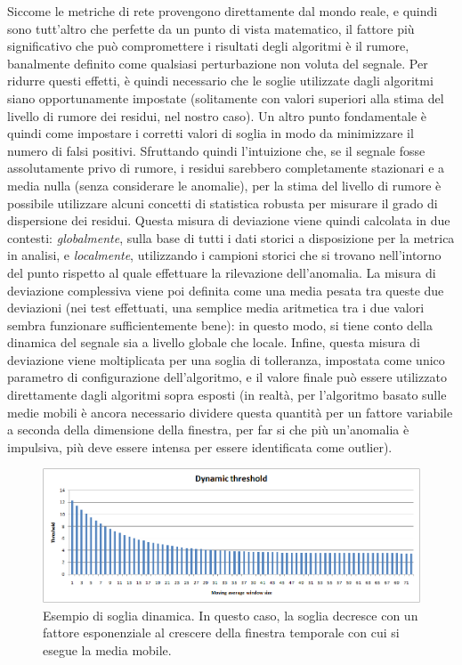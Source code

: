 \documentclass[12pt,a4paper,cucitura]{toptesi}
\begin{document}
Siccome le metriche di rete provengono direttamente dal mondo reale, e quindi sono tutt'altro che perfette da un punto di vista matematico, il fattore più significativo che può compromettere i risultati degli algoritmi è il rumore, banalmente definito come qualsiasi perturbazione non voluta del segnale.
Per ridurre questi effetti, è quindi necessario che le soglie utilizzate dagli algoritmi siano opportunamente impostate (solitamente con valori superiori alla stima del livello di rumore dei residui, nel nostro caso).
Un altro punto fondamentale è quindi come impostare i corretti valori di soglia in modo da minimizzare il numero di falsi positivi.
Sfruttando quindi l'intuizione che, se il segnale fosse assolutamente privo di rumore, i residui sarebbero completamente stazionari e a media nulla (senza considerare le anomalie), per la stima del livello di rumore è possibile utilizzare alcuni concetti di statistica robusta per misurare il grado di dispersione dei residui.
Questa misura di deviazione viene quindi calcolata in due contesti: \emph{globalmente}, sulla base di tutti i dati storici a disposizione per la metrica in analisi, e \emph{localmente}, utilizzando i campioni storici che si trovano nell'intorno del punto rispetto al quale effettuare la rilevazione dell'anomalia.
La misura di deviazione complessiva viene poi definita come una media pesata tra queste due deviazioni (nei test effettuati, una semplice media aritmetica tra i due valori sembra funzionare sufficientemente bene): in questo modo, si tiene conto della dinamica del segnale sia a livello globale che locale.
Infine, questa misura di deviazione viene moltiplicata per una soglia di tolleranza, impostata come unico parametro di configurazione dell'algoritmo, e il valore finale può essere utilizzato direttamente dagli algoritmi sopra esposti (in realtà, per l'algoritmo basato sulle medie mobili è ancora necessario dividere questa quantità per un fattore variabile a seconda della dimensione della finestra, per far si che più un'anomalia è impulsiva, più deve essere intensa per essere identificata come outlier).

\begin{figure}
\centering
\includegraphics[width=\linewidth]{threshold.png}
\caption[Soglia dinamica]{Esempio di soglia dinamica. In questo caso, la soglia decresce con un fattore esponenziale al crescere della finestra temporale con cui si esegue la media mobile.}
\end{figure}
\end{document}
